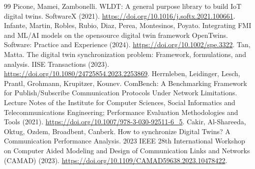 \documentclass[11pt,a4paper]{article}
\begin{document}
\begin{thebibliography}{99}
 Picone, Mamei, Zambonelli. WLDT: A general purpose library to build IoT digital twins. SoftwareX (2021). \url{https://doi.org/10.1016/j.softx.2021.100661}.
 Infante, Martin, Robles, Rubio, Diaz, Perea, Montesinos, Poyato. Integrating FMI and ML/AI models on the opensource digital twin framework OpenTwins. Software: Practice and Experience (2024). \url{https://doi.org/10.1002/spe.3322}.
 Tan, Matta. The digital twin synchronization problem: Framework, formulations, and analysis. IISE Transactions (2023). \url{https://doi.org/10.1080/24725854.2023.2253869}.
 Herrnleben, Leidinger, Lesch, Prantl, Grohmann, Krupitzer, Kounev. ComBench: A Benchmarking Framework for Publish/Subscribe Communication Protocols Under Network Limitations. Lecture Notes of the Institute for Computer Sciences, Social Informatics and Telecommunications Engineering; Performance Evaluation Methodologies and Tools (2021). \url{https://doi.org/10.1007/978-3-030-92511-6_5}.
 Cakir, Al-Shareeda, Oktug, Ozdem, Broadbent, Canberk. How to synchronize Digital Twins? A Communication Performance Analysis. 2023 IEEE 28th International Workshop on Computer Aided Modeling and Design of Communication Links and Networks (CAMAD) (2023). \url{https://doi.org/10.1109/CAMAD59638.2023.10478422}.
\end{thebibliography}
\end{document}

